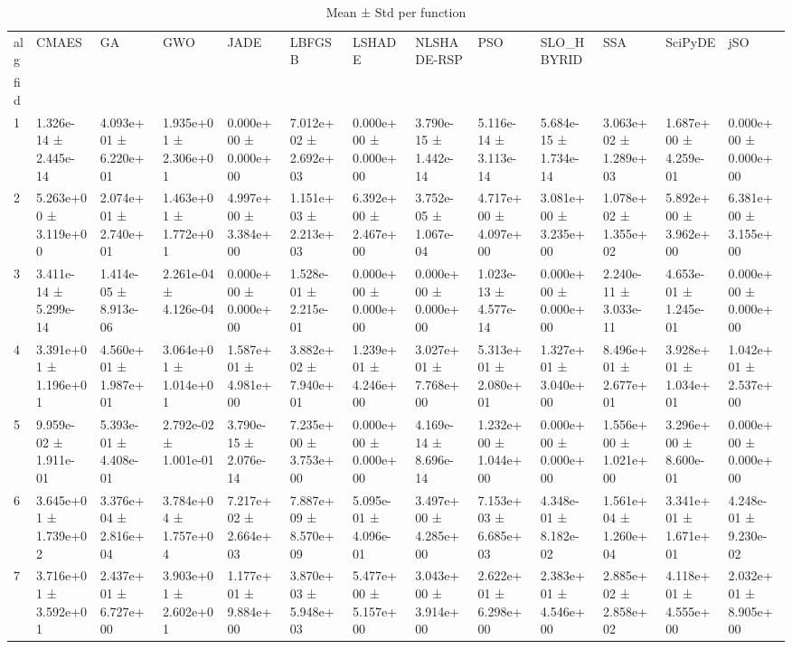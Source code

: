 \begin{table}
\caption{Mean ± Std per function}
\label{tab:meanstd_all}
\begin{tabular}{lllllllllllll}
\toprule
alg & CMAES & GA & GWO & JADE & LBFGSB & LSHADE & NLSHADE-RSP & PSO & SLO_HBYRID & SSA & SciPyDE & jSO \\
fid &  &  &  &  &  &  &  &  &  &  &  &  \\
\midrule
1 & 1.326e-14 ± 2.445e-14 & 4.093e+01 ± 6.220e+01 & 1.935e+01 ± 2.306e+01 & 0.000e+00 ± 0.000e+00 & 7.012e+02 ± 2.692e+03 & 0.000e+00 ± 0.000e+00 & 3.790e-15 ± 1.442e-14 & 5.116e-14 ± 3.113e-14 & 5.684e-15 ± 1.734e-14 & 3.063e+02 ± 1.289e+03 & 1.687e+00 ± 4.259e-01 & 0.000e+00 ± 0.000e+00 \\
2 & 5.263e+00 ± 3.119e+00 & 2.074e+01 ± 2.740e+01 & 1.463e+01 ± 1.772e+01 & 4.997e+00 ± 3.384e+00 & 1.151e+03 ± 2.213e+03 & 6.392e+00 ± 2.467e+00 & 3.752e-05 ± 1.067e-04 & 4.717e+00 ± 4.097e+00 & 3.081e+00 ± 3.235e+00 & 1.078e+02 ± 1.355e+02 & 5.892e+00 ± 3.962e+00 & 6.381e+00 ± 3.155e+00 \\
3 & 3.411e-14 ± 5.299e-14 & 1.414e-05 ± 8.913e-06 & 2.261e-04 ± 4.126e-04 & 0.000e+00 ± 0.000e+00 & 1.528e-01 ± 2.215e-01 & 0.000e+00 ± 0.000e+00 & 0.000e+00 ± 0.000e+00 & 1.023e-13 ± 4.577e-14 & 0.000e+00 ± 0.000e+00 & 2.240e-11 ± 3.033e-11 & 4.653e-01 ± 1.245e-01 & 0.000e+00 ± 0.000e+00 \\
4 & 3.391e+01 ± 1.196e+01 & 4.560e+01 ± 1.987e+01 & 3.064e+01 ± 1.014e+01 & 1.587e+01 ± 4.981e+00 & 3.882e+02 ± 7.940e+01 & 1.239e+01 ± 4.246e+00 & 3.027e+01 ± 7.768e+00 & 5.313e+01 ± 2.080e+01 & 1.327e+01 ± 3.040e+00 & 8.496e+01 ± 2.677e+01 & 3.928e+01 ± 1.034e+01 & 1.042e+01 ± 2.537e+00 \\
5 & 9.959e-02 ± 1.911e-01 & 5.393e-01 ± 4.408e-01 & 2.792e-02 ± 1.001e-01 & 3.790e-15 ± 2.076e-14 & 7.235e+00 ± 3.753e+00 & 0.000e+00 ± 0.000e+00 & 4.169e-14 ± 8.696e-14 & 1.232e+00 ± 1.044e+00 & 0.000e+00 ± 0.000e+00 & 1.556e+00 ± 1.021e+00 & 3.296e+00 ± 8.600e-01 & 0.000e+00 ± 0.000e+00 \\
6 & 3.645e+01 ± 1.739e+02 & 3.376e+04 ± 2.816e+04 & 3.784e+04 ± 1.757e+04 & 7.217e+02 ± 2.664e+03 & 7.887e+09 ± 8.570e+09 & 5.095e-01 ± 4.096e-01 & 3.497e+00 ± 4.285e+00 & 7.153e+03 ± 6.685e+03 & 4.348e-01 ± 8.182e-02 & 1.561e+04 ± 1.260e+04 & 3.341e+01 ± 1.671e+01 & 4.248e-01 ± 9.230e-02 \\
7 & 3.716e+01 ± 3.592e+01 & 2.437e+01 ± 6.727e+00 & 3.903e+01 ± 2.602e+01 & 1.177e+01 ± 9.884e+00 & 3.870e+03 ± 5.948e+03 & 5.477e+00 ± 5.157e+00 & 3.043e+00 ± 3.914e+00 & 2.622e+01 ± 6.298e+00 & 2.383e+01 ± 4.546e+00 & 2.885e+02 ± 2.858e+02 & 4.118e+01 ± 4.555e+00 & 2.032e+01 ± 8.905e+00 \\

\end{tabular}
\end{table}

